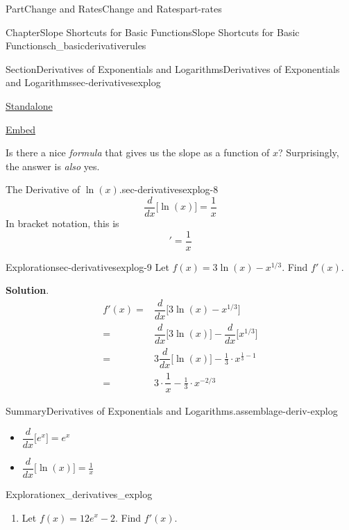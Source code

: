 \documentclass[oneside,10pt,]{tufte-book}
\newcommand{\blocktitlefont}{\relax}
\numberwithin{equation}{chapter}
\newcommand{\ddx}[1]{ \dfrac{d}{dx} \Big[ #1 \Big]  }
\newcommand{\amp}{&}
\begin{document}
\begin{partptx}{Part}{Change and Rates}{}{Change and Rates}{}{}{part-rates}
\begin{chapterptx}{Chapter}{Slope Shortcuts for Basic Functions}{}{Slope Shortcuts for Basic Functions}{}{}{ch_basicderivativerules}
\begin{sectionptx}{Section}{Derivatives of Exponentials and Logarithms}{}{Derivatives of Exponentials and Logarithms}{}{}{sec-derivativesexplog}
\begin{sidebyside}{2}{0.075}{0.075}{0.17}
\begin{sbspanel}{0.21}
\href{http://webwork.bridgew.edu/oer/functions_at_work/sec-derivativesexplog-7-5.html}{Standalone}%
\par
\href{http://webwork.bridgew.edu/oer/functions_at_work/sec-derivativesexplog-7-5-if.html}{Embed}%
\end{sbspanel}%
\end{sidebyside}%
 Is there a nice \emph{formula} that gives us the slope as a function of \(x\)?  Surprisingly, the answer is \emph{also} yes.%
\begin{paragraphs}{The Derivative of \(\ln(x)\).}{sec-derivativesexplog-8}%
%
\begin{equation*}
\ddx{\ln(x) } = \dfrac{1}{x}
\end{equation*}
In bracket notation, this is%
\begin{equation*}
[ \ln(x) ]' = \dfrac{1}{x}
\end{equation*}
\end{paragraphs}%
\begin{exploration}{Exploration}{}{sec-derivativesexplog-9}%
Let \(f(x) = 3\ln(x) - x^{1/3}\). Find \(f'(x)\).%
\par\smallskip%
\noindent\textbf{\blocktitlefont Solution}.\hypertarget{sec-derivativesexplog-9-2}{}\quad{}%
\begin{align*}
f'(x) = \amp  \ddx{ 3\ln(x) - x^{1/3} } \\
= \amp \ddx{3\ln(x)} - \ddx{x^{1/3}}\\
= \amp 3\ddx{\ln(x)} - \frac{1}{3} \cdot x^{\frac{1}{3}-1} \\
= \amp 3\cdot \dfrac{1}{x} - \frac{1}{3} \cdot x^{-2/3} 
\end{align*}
%
\end{exploration}%
\begin{assemblage}{Summary}{Derivatives of Exponentials and Logarithms.}{assemblage-deriv-explog}%
%
\begin{itemize}[label=\textbullet]
\item{}\(\displaystyle \ddx{e^x} = e^x \)%
\item{}\(\displaystyle \ddx{\ln(x)} = \frac{1}{x}\)%
\end{itemize}
%
\end{assemblage}
\begin{exploration}{Exploration}{}{ex_derivatives_explog}%
\begin{enumerate}[font=\bfseries,label=(\alph*),ref=\alph*]%
\item{}Let \(f(x) = 12e^x - 2\).  Find \(f'(x)\).%
\par\smallskip%

\end{enumerate}
\end{exploration}
\end{sectionptx}
\end{chapterptx}
\end{partptx}
\end{document}
